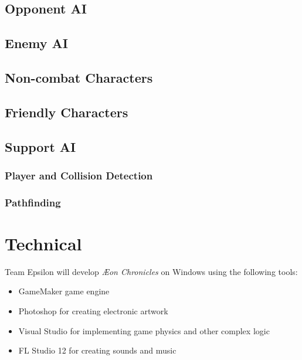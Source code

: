 \documentclass[12pt,titlepage]{article}
\newcommand\gametitle{\textit{\AE on Chronicles}\xspace}
\begin{document}
\subsection{Opponent AI}

\subsection{Enemy AI}

\subsection{Non-combat Characters}


\subsection{Friendly Characters}

\subsection{Support AI}

\subsubsection{Player and Collision Detection}

\subsubsection{Pathfinding}

\newpage
\section{Technical}
%

Team Epsilon will develop \gametitle on Windows using the following tools:

\begin{itemize}
    \item GameMaker game engine
    \item Photoshop for creating electronic artwork
    \item Visual Studio for implementing game physics and other complex logic
    \item FL Studio 12 for creating sounds and music
\end{itemize}
\end{document}
